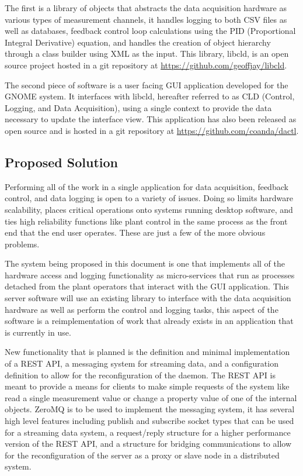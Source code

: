       The first is a library of objects that abstracts the data acquisition
      hardware as various types of measurement channels, it handles logging
      to both CSV files as well as databases, feedback control loop
      calculations using the PID (Proportional Integral Derivative) equation,
      and handles the creation of object hierarchy through a class builder
      using XML as the input. This library, libcld, is an open source project
      hosted in a git repository at \url{https://github.com/geoffjay/libcld}.

      The second piece of software is a user facing GUI application developed for
      the GNOME system. It interfaces with libcld, hereafter referred to as
      CLD (Control, Logging, and Data Acquisition), using a single context to
      provide the data necessary to update the interface view. This application
      has also been released as open source and is hosted in a git repository
      at \url{https://github.com/coanda/dactl}.

  \subsection{Proposed Solution}\label{sec:desc-soln}

    Performing all of the work in a single application for data acquisition,
    feedback control, and data logging is open to a variety of issues. Doing so
    limits hardware scalability, places critical operations onto systems running
    desktop software, and ties high reliability functions like plant control in
    the same process as the front end that the end user operates. These are just
    a few of the more obvious problems.

    The system being proposed in this document is one that implements all of
    the hardware access and logging functionality as micro-services that run as
    processes detached from the plant operators that interact with the GUI
    application. This server software will use an existing library to interface
    with the data acquisition hardware as well as perform the control and
    logging tasks, this aspect of the software is a reimplementation of work
    that already exists in an application that is currently in use.

    New functionality that is planned is the definition and minimal
    implementation of a REST API, a messaging system for streaming data, and a
    configuration definition to allow for the reconfiguration of the daemon. The
    REST API is meant to provide a means for clients to make simple requests of
    the system like read a single measurement value or change a property value
    of one of the internal objects. ZeroMQ is to be used to implement the
    messaging system, it has several high level features including publish and
    subscribe socket types that can be used for a streaming data system, a
    request/reply structure for a higher performance version of the REST API,
    and a structure for bridging communications to allow for the reconfiguration
    of the server as a proxy or slave node in a distributed system.

